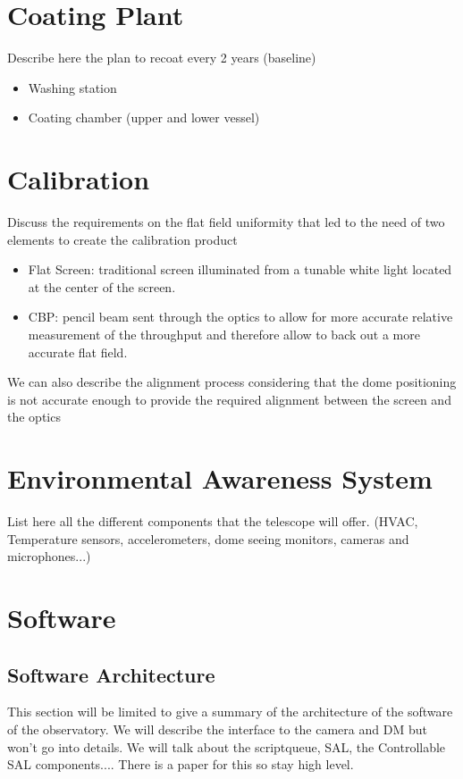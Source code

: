 \section{Coating Plant}
Describe here the plan to recoat every 2 years (baseline)
\begin{itemize}
\item Washing station
\item Coating chamber (upper and lower vessel)
\end{itemize}
\section{Calibration}
Discuss the requirements on the flat field uniformity that led to the need of two elements to create the calibration product
\begin{itemize}
\item Flat Screen: traditional screen illuminated from a tunable white light located at the center of the screen. 
\item CBP: pencil beam sent through the optics to allow for more accurate relative measurement of the throughput and therefore allow to back out a more accurate flat field. 
\end{itemize}
We can also describe the alignment process considering that the dome positioning is not accurate enough to provide the required alignment between the screen and the optics %
\section{Environmental Awareness System}
List here all the different components that the telescope will offer. (HVAC, Temperature sensors, accelerometers, dome seeing monitors, cameras and microphones...)

\section{Software}
\subsection{Software Architecture}
This section will be limited to give a summary of the architecture of the software of the observatory. We will describe the interface to the camera and DM but won't go into details. We will talk about the scriptqueue, SAL, the Controllable SAL components.... There is a paper for this so stay high level.\\
